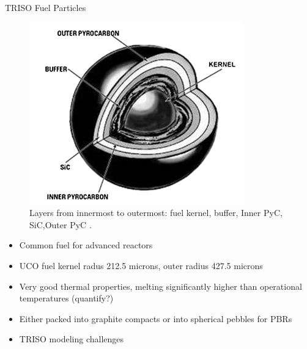 \documentclass[9pt,t,aspectratio=169]{beamer}
\begin{document}
\begin{frame}{TRISO Fuel Particles}
    \begin{minipage}[t]{0.45\linewidth}
        \begin{figure}
            \centering
            \includegraphics[width=0.9\linewidth]{figures/TRISO_diagram_Zhou_Tang.png}
            \caption{Layers from innermost to outermost: fuel kernel, buffer, Inner PyC, SiC,Outer PyC \cite{zhou_tang}.}
        \end{figure}
    \end{minipage}
    \hfill%
    \begin{minipage}[t]{0.45\linewidth}
        \begin{itemize}
            \item Common fuel for advanced reactors
            \item UCO fuel kernel radus 212.5 microns, outer radius 427.5 microns
            \item Very good thermal properties, melting significantly higher than operational temperatures (quantify?)
            \item Either packed into graphite compacts or into spherical pebbles for PBRs
            \item TRISO modeling challenges
        \end{itemize}
    \end{minipage}
\end{frame}
\end{document}
